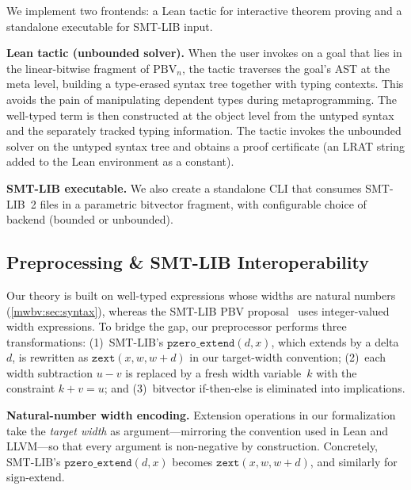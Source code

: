 We implement two frontends: a Lean tactic for interactive theorem proving
and a standalone executable for SMT-LIB input.

\noindent\textbf{Lean tactic (unbounded solver).}
When the user invokes \ourtactic{} on a goal that lies in the linear-bitwise
fragment of $\text{PBV}_n$, the tactic traverses the goal's AST at the meta
level, building a type-erased syntax tree together with typing contexts. This
avoids the pain of manipulating dependent types during metaprogramming. The
well-typed term is then constructed at the object level from the untyped syntax
and the separately tracked typing information. The tactic invokes the unbounded
solver on the untyped syntax tree and obtains a proof certificate (an LRAT
string added to the Lean environment as a constant).

\noindent\textbf{SMT-LIB executable.}
We also create a standalone CLI that consumes SMT-LIB~2 files
in a parametric bitvector fragment, with configurable choice of backend (bounded or unbounded).

\subsection{Preprocessing \& SMT-LIB Interoperability}

Our theory is built on well-typed expressions whose widths are natural numbers
(\cref{mwbv:sec:syntax}), whereas the SMT-LIB PBV
proposal~\cite{bit-precise-parametric-bv} uses integer-valued width expressions.
To bridge the gap, our preprocessor performs three transformations:
(1)~SMT-LIB's $\texttt{pzero\_extend}(d, x)$, which extends by a delta~$d$,
is rewritten as $\texttt{zext}(x, w, w+d)$ in our target-width convention;
(2)~each width subtraction $u - v$ is replaced by a fresh width variable~$k$
with the constraint $k + v = u$; and
(3)~bitvector if-then-else is eliminated into implications.

\noindent\textbf{Natural-number width encoding.}
Extension operations in our formalization take the \emph{target width}
as argument---mirroring the convention used in Lean and LLVM---so that every
argument is non-negative by construction.
Concretely, SMT-LIB's $\texttt{pzero\_extend}(d, x)$ becomes
$\texttt{zext}(x, w, w{+}d)$, and similarly for sign-extend.

